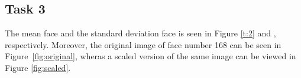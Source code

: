 \documentclass[a4paper,10pt]{article}
\begin{document}
\subsection{Task 3}
The mean face and the standard deviation face is seen in
Figure {\ref{t:2}} \protect {} and \protect
{}, respectively. Moreover,
the original image of face number 168 can be seen in
Figure {\ref{fig:original}}, wheras a scaled version
of the same image can be viewed in Figure {\ref{fig:scaled}}.
\begin{figure}[H]
   \\
\end{figure}
\end{document}
